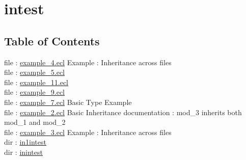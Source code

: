 \chapter*{intest}
\hypertarget{ecldoc:toc:intest}{}


\section*{Table of Contents}
file : \hyperlink{ecldoc:toc:intest.example_4}{example\_4.ecl}  Example : Inheritance across files \\
file : \hyperlink{ecldoc:toc:intest.example_5}{example\_5.ecl}   \\
file : \hyperlink{ecldoc:toc:intest.example_11}{example\_11.ecl}   \\
file : \hyperlink{ecldoc:toc:intest.example_9}{example\_9.ecl}   \\
file : \hyperlink{ecldoc:toc:intest.example_7}{example\_7.ecl}  Basic Type Example \\
file : \hyperlink{ecldoc:toc:intest.example_2}{example\_2.ecl}  Basic Inheritance documentation : mod\_3 inherits both mod\_1 and mod\_2 \\
file : \hyperlink{ecldoc:toc:intest.example_3}{example\_3.ecl}  Example : Inheritance across files \\
dir : \hyperlink{ecldoc:toc:intest/in1intest}{in1intest}   \\
dir : \hyperlink{ecldoc:toc:intest/inintest}{inintest}   \\











